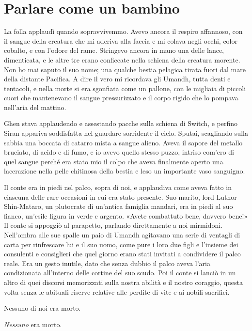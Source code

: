 \chapter{Parlare come un bambino}

La folla applaudì quando sopravvivemmo. Avevo ancora il respiro
affannoso, con il sangue della creatura che mi aderiva alla faccia e mi
colava negli occhi, color cobalto, e con l'odore del rame. Stringevo
ancora in mano una delle lance, dimenticata, e le altre tre erano
conficcate nella schiena della creatura morente. Non ho mai saputo il
suo nome; una qualche bestia pelagica tirata fuori dal mare della
distante Pacifica. A dire il vero mi ricordava gli Umandh, tutta denti e
tentacoli, e nella morte si era sgonfiata come un pallone, con le
migliaia di piccoli cuori che mantenevano il sangue pressurizzato e il
corpo rigido che lo pompava nell'aria del mattino.

Ghen stava applaudendo e assestando pacche sulla schiena di Switch, e
perfino Siran appariva soddisfatta nel guardare sorridente il cielo.
Sputai, scagliando sulla sabbia una boccata di catarro mista a sangue
alieno. Aveva il sapore del metallo bruciato, di acido e di fumo, e io
avevo quello stesso puzzo, intriso com'ero di quel sangue perché era
stato mio il colpo che aveva finalmente aperto una lacerazione nella
pelle chitinosa della bestia e leso un importante vaso sanguigno.

Il conte era in piedi nel palco, sopra di noi, e applaudiva come aveva
fatto in ciascuna delle rare occasioni in cui era stato presente. Suo
marito, lord Luthor Shin-Mataro, un plutocrate di un'antica famiglia
mandari, era in piedi al suo fianco, un'esile figura in verde e argento.
«Avete combattuto bene, davvero bene!» Il conte si appoggiò al
parapetto, parlando direttamente a noi mirmidoni. Nell'ombra alle sue
spalle un paio di Umandh agitavano una serie di ventagli di carta per
rinfrescare lui e il suo uomo, come pure i loro due figli e l'insieme
dei consulenti e consiglieri che quel giorno erano stati invitati a
condividere il palco reale. Era un gesto inutile, dato che senza dubbio
il palco aveva l'aria condizionata all'interno delle cortine del suo
scudo. Poi il conte si lanciò in un altro di quei discorsi memorizzati
sulla nostra abilità e il nostro coraggio, questa volta senza le
abituali riserve relative alle perdite di vite e ai nobili sacrifici.

Nessuno di noi era morto.

\emph{Nessuno} era morto.

